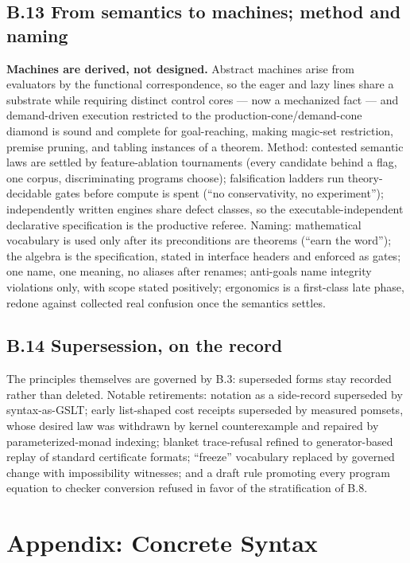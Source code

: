 \documentclass[11pt]{article}
\begin{document}
\subsection*{B.13 From semantics to machines; method and naming}
\textbf{Machines are derived, not designed.}  Abstract machines arise
from evaluators by the functional correspondence, so the eager and lazy
lines share a substrate while requiring distinct control cores --- now a
mechanized fact --- and demand-driven execution restricted to the
production-cone/demand-cone diamond is sound and complete for
goal-reaching, making magic-set restriction, premise pruning, and tabling
instances of a theorem.  Method: contested semantic laws are settled by
feature-ablation tournaments (every candidate behind a flag, one corpus,
discriminating programs choose); falsification ladders run
theory-decidable gates before compute is spent (``no conservativity, no
experiment''); independently written engines share defect classes, so the
executable-independent declarative specification is the productive
referee.  Naming: mathematical vocabulary is used only after its
preconditions are theorems (``earn the word''); the algebra is the
specification, stated in interface headers and enforced as gates; one
name, one meaning, no aliases after renames; anti-goals name integrity
violations only, with scope stated positively; ergonomics is a
first-class late phase, redone against collected real confusion once the
semantics settles.

\subsection*{B.14 Supersession, on the record}
The principles themselves are governed by B.3: superseded forms stay
recorded rather than deleted.  Notable retirements: notation as a
side-record superseded by syntax-as-GSLT; early list-shaped cost receipts
superseded by measured pomsets, whose desired law was withdrawn by
kernel counterexample and repaired by parameterized-monad indexing;
blanket trace-refusal refined to generator-based replay of standard
certificate formats; ``freeze'' vocabulary replaced by governed change
with impossibility witnesses; and a draft rule promoting every program
equation to checker conversion refused in favor of the stratification of
B.8.


\section{Appendix: Concrete Syntax}
\label{app:grammar}
\end{document}
